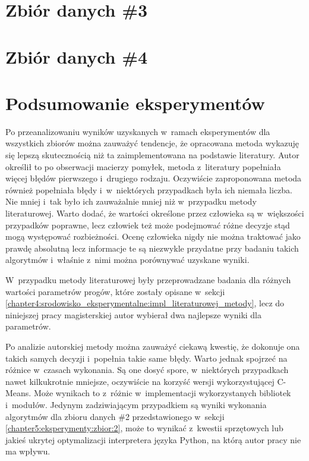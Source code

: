 \documentclass[../Kamil_Kowalewski_Main.tex]{subfiles}
\begin{document}
{    \section{Zbiór danych \#3}
    \label{chapter5:eksperymenty:zbior:3} {
        
    }

    \section{Zbiór danych \#4}
    \label{chapter5:eksperymenty:zbior:4} {
        
    }

    \section{Podsumowanie eksperymentów}
    \label{chapter5:eksperymenty:podsumowanie} {
        Po przeanalizowaniu wyników uzyskanych w~ramach eksperymentów dla wszystkich
        zbiorów można zauważyć tendencje, że opracowana metoda wykazuję się lepszą
        skutecznością niż ta zaimplementowana na podstawie literatury. Autor określił
        to po obserwacji macierzy pomyłek, metoda z~literatury popełniała więcej błędów
        pierwszego i~drugiego rodzaju. Oczywiście zaproponowana metoda również
        popełniała błędy i~w~niektórych przypadkach była ich niemała liczba. Nie mniej
        i~tak było ich zauważalnie mniej niż w~przypadku metody literaturowej. Warto
        dodać, że wartości określone przez człowieka są w~większości przypadków
        poprawne, lecz człowiek też może podejmować różne decyzje stąd mogą występować
        rozbieżności. Ocenę człowieka nigdy nie można traktować jako prawdę absolutną
        lecz informacje te są niezwykle przydatne przy badaniu takich algorytmów
        i~właśnie z~nimi można porównywać uzyskane wyniki.

        W~przypadku metody literaturowej były przeprowadzane badania dla różnych
        wartości parametrów progów, które zostały opisane w~sekcji
        \ref{chapter4:srodowisko_eksperymentalne:impl_literaturowej_metody}, lecz do
        niniejszej pracy magisterskiej autor wybierał dwa najlepsze wyniki dla parametrów.

        Po analizie autorskiej metody można zauważyć ciekawą kwestię, że dokonuje ona
        takich samych decyzji i~popełnia takie same błędy. Warto jednak spojrzeć na
        różnice w~czasach wykonania. Są one dosyć spore, w~niektórych przypadkach nawet
        kilkukrotnie mniejsze, oczywiście na korzyść wersji wykorzystującej C-Means.
        Może wynikach to z~różnic w~implementacji wykorzystanych bibliotek i~modułów.
        Jedynym zadziwiającym przypadkiem są wyniki wykonania algorytmów dla zbioru
        danych \#2 przedstawionego w~sekcji \ref{chapter5:eksperymenty:zbior:2}, może
        to wynikać z~kwestii sprzętowych lub jakieś ukrytej optymalizacji interpretera
        języka Python, na którą autor pracy nie ma wpływu.

}}
\end{document}
